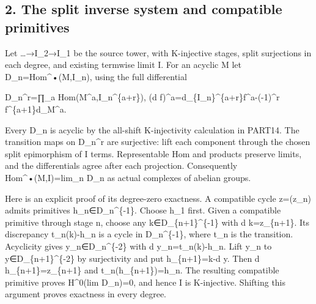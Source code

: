 \documentclass[11pt]{article}
\begin{document}
\subsection{2. The split inverse system and compatible primitives}\label{proofs-9746-10132-the-split-inverse-system-and-compatible-primitives}

Let …\allowbreak{}→I\_\allowbreak{}2\allowbreak{}→I\_\allowbreak{}1 be the source tower,\allowbreak{} with K-injective stages,\allowbreak{} split surjections in each degree,\allowbreak{} and existing termwise limit I. For an acyclic M let D\_\allowbreak{}n\allowbreak{}=Hom\textasciicircum{}•(M,\allowbreak{}I\_\allowbreak{}n)\allowbreak{},\allowbreak{} using the full differential

D\_\allowbreak{}n\textasciicircum{}r\allowbreak{}=∏\_\allowbreak{}a Hom(M\textasciicircum{}a,\allowbreak{}I\_\allowbreak{}n\textasciicircum{}\{a\allowbreak{}+r\})\allowbreak{},\allowbreak{} (d f)\allowbreak{}\textasciicircum{}a\allowbreak{}=d\_\allowbreak{}\{I\_\allowbreak{}n\}\textasciicircum{}\{a\allowbreak{}+r\}f\textasciicircum{}a-(-1)\allowbreak{}\textasciicircum{}r f\textasciicircum{}\{a\allowbreak{}+1\}d\_\allowbreak{}M\textasciicircum{}a.

Every D\_\allowbreak{}n is acyclic by the all-shift K-injectivity calculation in PART14. The transition maps on D\_\allowbreak{}n\textasciicircum{}r are surjective:\allowbreak{} lift each component through the chosen split epimorphism of I terms. Representable Hom and products preserve limits,\allowbreak{} and the differentials agree after each projection. Consequently Hom\textasciicircum{}•(M,\allowbreak{}I)\allowbreak{}\allowbreak{}=lim\_\allowbreak{}n D\_\allowbreak{}n as actual complexes of abelian groups.

Here is an explicit proof of its degree-zero exactness. A compatible cycle z\allowbreak{}=(z\_\allowbreak{}n)\allowbreak{} admits primitives h\_\allowbreak{}n\allowbreak{}∈D\_\allowbreak{}n\textasciicircum{}\{-1\}. Choose h\_\allowbreak{}1 first. Given a compatible primitive through stage n,\allowbreak{} choose any k\allowbreak{}∈D\_\allowbreak{}\{n\allowbreak{}+1\}\textasciicircum{}\{-1\} with d k\allowbreak{}=z\_\allowbreak{}\{n\allowbreak{}+1\}. Its discrepancy t\_\allowbreak{}n(k)\allowbreak{}-h\_\allowbreak{}n is a cycle in D\_\allowbreak{}n\textasciicircum{}\{-1\},\allowbreak{} where t\_\allowbreak{}n is the transition. Acyclicity gives y\_\allowbreak{}n\allowbreak{}∈D\_\allowbreak{}n\textasciicircum{}\{-2\} with d y\_\allowbreak{}n\allowbreak{}=t\_\allowbreak{}n(k)\allowbreak{}-h\_\allowbreak{}n. Lift y\_\allowbreak{}n to y\allowbreak{}∈D\_\allowbreak{}\{n\allowbreak{}+1\}\textasciicircum{}\{-2\} by surjectivity and put h\_\allowbreak{}\{n\allowbreak{}+1\}\allowbreak{}=k-d y. Then d h\_\allowbreak{}\{n\allowbreak{}+1\}\allowbreak{}=z\_\allowbreak{}\{n\allowbreak{}+1\} and t\_\allowbreak{}n(h\_\allowbreak{}\{n\allowbreak{}+1\})\allowbreak{}\allowbreak{}=h\_\allowbreak{}n. The resulting compatible primitive proves H\^{}0(lim D\_\allowbreak{}n)\allowbreak{}\allowbreak{}=0,\allowbreak{} and hence I is K-injective. Shifting this argument proves exactness in every degree.
\end{document}
